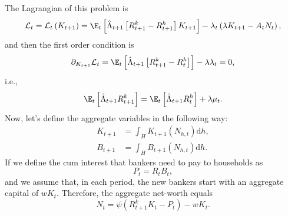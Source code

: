 \documentclass{article}
\begin{document}
	The Lagrangian of this problem is
	\begin{equation}
		\mathcal{L}_t = \mathcal{L}_t\left(K_{t+1}\right) = \E_t\left[\hat{\Lambda}_{t+1}\left[R_{t+1}^k-R_{t+1}^h\right]K_{t+1}\right] - \lambda_t\left(\lambda K_{t+1}-A_tN_t\right),
	\end{equation}
	and then the first order condition is
	\begin{equation}
		\partial_{K_{t+1}}\mathcal{L}_t =  \E_t\left[\hat{\Lambda}_{t+1}\left[R_{t+1}^k-R_{t}^h\right]\right] - \lambda \lambda_t = 0,
	\end{equation}
i.e.,
	\begin{equation}\label{eq:RBC-GK_Rk_Rh}
		  \E_t\left[\hat{\Lambda}_{t+1}R_{t+1}^k\right] = \E_t\left[\hat{\Lambda}_{t+1}R_{t}^h\right] + \lambda \mu_t.
	\end{equation}
	Now, let's define the aggregate variables in the following way:
	\begin{equation}
		\begin{aligned}
			K_{t+1} & = \int_{H} K_{t+1}\left(N_{h,t}\right) \text{d} h, \\
			B_{t+1}& = \int_H B_{t+1}\left(N_{h,t}\right) \text{d} h.
		\end{aligned}
	\end{equation}
	If we define the cum interest that bankers need to pay to households as
	\begin{equation}
		P_t = R_t B_t,
	\end{equation}
	and we assume that, in each period, the new bankers start with an aggregate capital of $wK_t$. Therefore, the aggregate net-worth equals
	\begin{equation}\label{eq:RBC-GK_N}
		N_t = \psi\left(R_{t+1}^k K_t-P_t\right) - wK_t.
	\end{equation}
\end{document}
